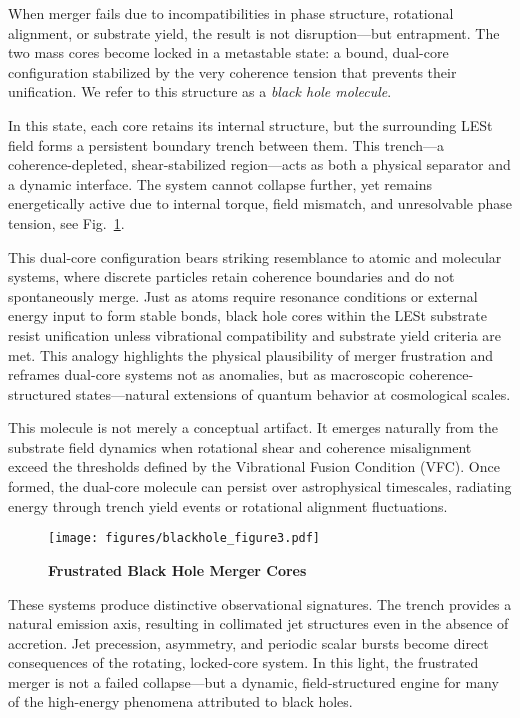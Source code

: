 \documentclass[sn-mathphys]{sn-jnl}
\theoremstyle{thmstyleone}%
\theoremstyle{thmstyletwo}%
\theoremstyle{thmstylethree}%
\begin{document}
When merger fails due to incompatibilities in phase structure, rotational alignment, or substrate yield, the result is not disruption—but entrapment. The two mass cores become locked in a metastable state: a bound, dual-core configuration stabilized by the very coherence tension that prevents their unification. We refer to this structure as a \textit{black hole molecule}.

In this state, each core retains its internal structure, but the surrounding LESt field forms a persistent boundary trench between them. This trench—a coherence-depleted, shear-stabilized region—acts as both a physical separator and a dynamic interface. The system cannot collapse further, yet remains energetically active due to internal torque, field mismatch, and unresolvable phase tension, see Fig.~\ref{fig:molecule}.

This dual-core configuration bears striking resemblance to atomic and molecular systems, where discrete particles retain coherence boundaries and do not spontaneously merge. Just as atoms require resonance conditions or external energy input to form stable bonds, black hole cores within the LESt substrate resist unification unless vibrational compatibility and substrate yield criteria are met. This analogy highlights the physical plausibility of merger frustration and reframes dual-core systems not as anomalies, but as macroscopic coherence-structured states—natural extensions of quantum behavior at cosmological scales.

This molecule is not merely a conceptual artifact. It emerges naturally from the substrate field dynamics when rotational shear and coherence misalignment exceed the thresholds defined by the Vibrational Fusion Condition (VFC). Once formed, the dual-core molecule can persist over astrophysical timescales, radiating energy through trench yield events or rotational alignment fluctuations.

\begin{figure}[H]
    \centering
    \texttt{[image: figures/blackhole\_figure3.pdf]}
    \caption{
        \textbf{Frustrated Black Hole Merger Cores}
    }
    \label{fig:molecule}
\end{figure}

These systems produce distinctive observational signatures. The trench provides a natural emission axis, resulting in collimated jet structures even in the absence of accretion. Jet precession, asymmetry, and periodic scalar bursts become direct consequences of the rotating, locked-core system. In this light, the frustrated merger is not a failed collapse—but a dynamic, field-structured engine for many of the high-energy phenomena attributed to black holes.
\end{document}
